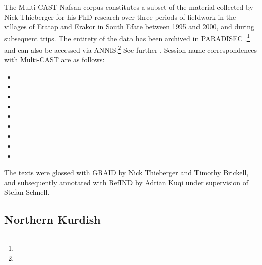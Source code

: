 The Multi-CAST Nafsan corpus constitutes a subset of the material collected by Nick Thieberger for his PhD research over three periods of fieldwork in the villages of Eratap and Erakor in South Efate between 1995 and 2000, and during subsequent trips. The entirety of the data has been archived in PARADISEC ,\footnote{} and can also be accessed via ANNIS.\footnote{} See further . Session name correspondences with Multi-CAST are as follows:
%
\begin{itemize}
	\TabPositions{5em}
	\item	{}	\tab	{}	\quad	{}
	\item	{}	\tab	{}	\quad	{}
	\item	{}	\tab	{}	\quad	{}
	\item	{}	\tab	{}	\quad	{}
	\item	{}	\tab	{}	\quad	{}
	\item	{}	\tab	{}	\quad	{}
	\item	{}	\tab	{}	\quad	{}
	\item	{}	\tab	{}	\quad	{}
	\item	{}	\tab	{}	\quad	{}
\end{itemize}
%
The texts were glossed with GRAID by Nick Thieberger and Timothy Brickell, and subsequently annotated with RefIND by Adrian Kuqi under supervision of Stefan Schnell.



\subsection{Northern Kurdish}
\label{ssec:corpus-nkurd}

\noindent{}

